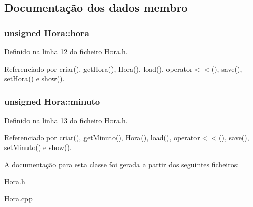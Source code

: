 \subsection{Documentação dos dados membro}
\hypertarget{class_hora_ab901e62ae1158965687dc736a45ee8fe}{
\subsubsection[{hora}]{\setlength{\rightskip}{0pt plus 5cm}unsigned Hora\+::hora\hspace{0.3cm}{\ttfamily [private]}}}\label{class_hora_ab901e62ae1158965687dc736a45ee8fe}


Definido na linha 12 do ficheiro Hora.\+h.



Referenciado por criar(), get\+Hora(), Hora(), load(), operator$<$$<$(), save(), set\+Hora() e show().

\hypertarget{class_hora_a9d33ce2d8a3f4b3d05b2a3c6df782fa4}{
\subsubsection[{minuto}]{\setlength{\rightskip}{0pt plus 5cm}unsigned Hora\+::minuto\hspace{0.3cm}{\ttfamily [private]}}}\label{class_hora_a9d33ce2d8a3f4b3d05b2a3c6df782fa4}


Definido na linha 13 do ficheiro Hora.\+h.



Referenciado por criar(), get\+Minuto(), Hora(), load(), operator$<$$<$(), save(), set\+Minuto() e show().



A documentação para esta classe foi gerada a partir dos seguintes ficheiros\+:\begin{DoxyCompactItemize}
\item 
\hyperlink{_hora_8h}{Hora.\+h}\item 
\hyperlink{_hora_8cpp}{Hora.\+cpp}\end{DoxyCompactItemize}
